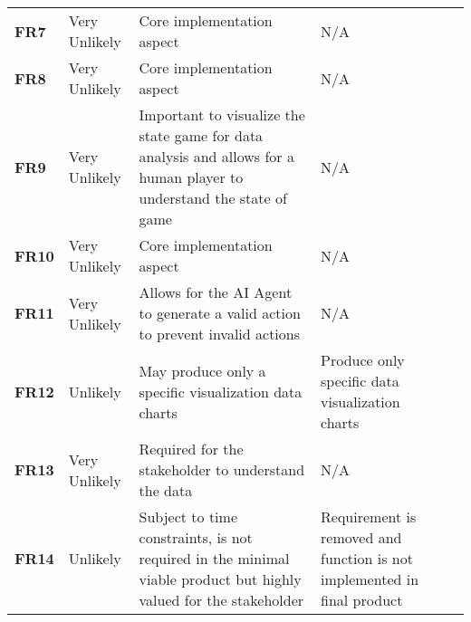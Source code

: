 \documentclass[12pt]{article}
\begin{document}
\begin{table}[H]
\begin{tabular}{|l|p{}|p{}|p{}|l}
\textbf{FR7}                                & Very Unlikely                                      & Core implementation aspect                                                                                            & N/A                                                                     &  \\ \cline{1-4}
\textbf{FR8}                                & Very Unlikely                                      & Core implementation aspect                                                                                            & N/A                                                                     &  \\ \cline{1-4}
\textbf{FR9}                                & Very Unlikely                                      & Important to visualize the state game for data analysis and allows for a human player to understand the state of game & N/A                                                                     &  \\ \cline{1-4}
\textbf{FR10}                               & Very Unlikely                                      & Core implementation aspect                                                                                            & N/A                                                                     &  \\ \cline{1-4}
\textbf{FR11}                               & Very Unlikely                                      & Allows for the AI Agent to generate a valid action to prevent invalid actions                                         & N/A                                                                     &  \\ \cline{1-4}
\textbf{FR12}                               & Unlikely                                           & May produce only a specific visualization data charts                                                                 & Produce only specific data visualization charts                         &  \\ \cline{1-4}
\textbf{FR13}                               & Very Unlikely                                      & Required for the stakeholder to understand the data                                                                   & N/A                                                                     &  \\ \cline{1-4}
\textbf{FR14}                               & Unlikely                                           & Subject to time constraints, is not required in the minimal viable product but highly valued for the stakeholder                                            & Requirement is removed and function is not implemented in final product &  \\ \cline{1-4}

\end{tabular}
\end{table}
\end{document}
